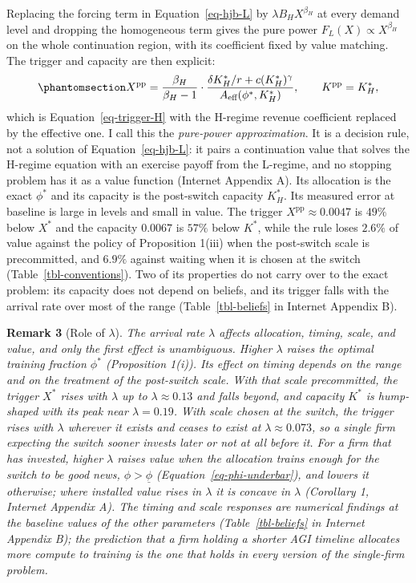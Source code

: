 \documentclass[
  11pt,
  letterpaper,
]{scrartcl}
\begin{document}
Replacing the forcing term in Equation~\ref{eq-hjb-L} by
\(\lambda B_H X^{\beta_H}\) at every demand level and dropping the
homogeneous term gives the pure power \(F_L(X) \propto X^{\beta_H}\) on
the whole continuation region, with its coefficient fixed by value
matching. The trigger and capacity are then explicit:
\begin{equation}\protect\phantomsection\label{eq-trigger-phi}{
X^{\text{pp}} = \frac{\beta_H}{\beta_H - 1} \cdot \frac{\delta K_H^*/r + c(K_H^*)^\gamma}{A_{\text{eff}}(\phi^*, K_H^*)}, \qquad K^{\text{pp}} = K_H^*,
}\end{equation} which is Equation~\ref{eq-trigger-H} with the H-regime
revenue coefficient replaced by the effective one. I call this the
\emph{pure-power approximation}. It is a decision rule, not a solution
of Equation~\ref{eq-hjb-L}: it pairs a continuation value that solves
the H-regime equation with an exercise payoff from the L-regime, and no
stopping problem has it as a value function (Internet Appendix A). Its
allocation is the exact \(\phi^*\) and its capacity is the post-switch
capacity \(K_H^*\). Its measured error at baseline is large in levels
and small in value. The trigger \(X^{\text{pp}} \approx 0.0047\) is
\(49\%\) below \(X^*\) and the capacity \(0.0067\) is \(57\%\) below
\(K^*\), while the rule loses \(2.6\%\) of value against the policy of
Proposition 1(iii) when the post-switch scale is precommitted, and
\(6.9\%\) against waiting when it is chosen at the switch
(Table~\ref{tbl-conventions}). Two of its properties do not carry over
to the exact problem: its capacity does not depend on beliefs, and its
trigger falls with the arrival rate over most of the range
(Table~\ref{tbl-beliefs} in Internet Appendix B).

\textbf{Remark 3} (Role of \(\lambda\)). \emph{The arrival rate
\(\lambda\) affects allocation, timing, scale, and value, and only the
first effect is unambiguous. Higher \(\lambda\) raises the optimal
training fraction \(\phi^*\) (Proposition 1(i)). Its effect on timing
depends on the range and on the treatment of the post-switch scale. With
that scale precommitted, the trigger \(X^*\) rises with \(\lambda\) up
to \(\lambda \approx 0.13\) and falls beyond, and capacity \(K^*\) is
hump-shaped with its peak near \(\lambda = 0.19\). With scale chosen at
the switch, the trigger rises with \(\lambda\) wherever it exists and
ceases to exist at \(\lambda \approx 0.073\), so a single firm expecting
the switch sooner invests later or not at all before it. For a firm that
has invested, higher \(\lambda\) raises value when the allocation trains
enough for the switch to be good news, \(\phi > \underline{\phi}\)
(Equation~\ref{eq-phi-underbar}), and lowers it otherwise; where
installed value rises in \(\lambda\) it is concave in \(\lambda\)
(Corollary 1, Internet Appendix A). The timing and scale responses are
numerical findings at the baseline values of the other parameters
(Table~\ref{tbl-beliefs} in Internet Appendix B); the prediction that a
firm holding a shorter AGI timeline allocates more compute to training
is the one that holds in every version of the single-firm problem.}
\end{document}
